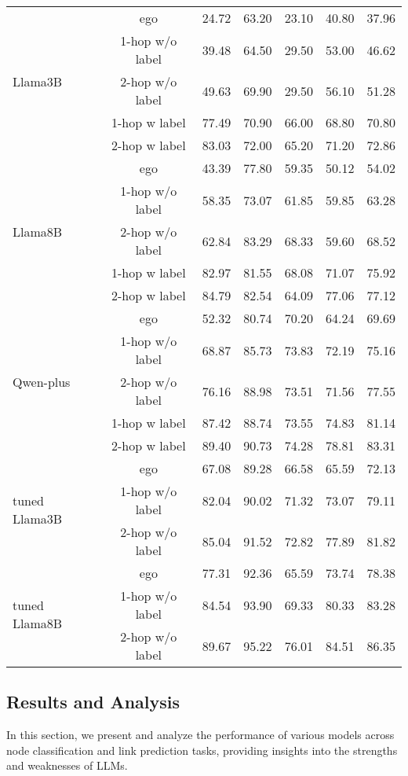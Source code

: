 \begin{table}[htbp]
{\begin{tabular}{l c c c c c c}
\multirow{5}{*}{Llama3B} & ego & 24.72 & 63.20 & 23.10 & 40.80  & 37.96\\
& 1-hop w/o label & 39.48 & 64.50 & 29.50 & 53.00  & 46.62\\
& 2-hop w/o label & 49.63 & 69.90 & 29.50 & 56.10  & 51.28\\
& 1-hop w label & 77.49 & 70.90 & 66.00 & 68.80  & 70.80\\
& 2-hop w label & 83.03 & 72.00 & 65.20 & 71.20  & 72.86\\
\midrule
\multirow{5}{*}{Llama8B} & ego & 43.39 & 77.80 & 59.35 & 50.12  & 54.02\\
& 1-hop w/o label & 58.35 & 73.07 & 61.85 & 59.85  & 63.28\\
& 2-hop w/o label & 62.84 & 83.29 & 68.33 & 59.60  & 68.52\\
& 1-hop w label & 82.97 & 81.55 & 68.08 & 71.07  & 75.92\\
& 2-hop w label & 84.79 & 82.54 & 64.09 & 77.06  & 77.12\\
\midrule
\multirow{5}{*}{Qwen-plus} & ego & 52.32 & 80.74 & 70.20 & 64.24  & 69.69\\
& 1-hop w/o label & 68.87 & 85.73 & 73.83 & 72.19  & 75.16\\
& 2-hop w/o label & 76.16 & 88.98 & 73.51 & 71.56  & 77.55\\
& 1-hop w label & 87.42 & 88.74 & 73.55 & 74.83  & 81.14\\
& 2-hop w label & 89.40 \cellcolor{cyan!50} & 90.73 & 74.28 & 78.81  & 83.31\\
\midrule
\multirow{3}{*}{tuned Llama3B} & ego & 67.08 & 89.28 & 66.58 & 65.59 & 72.13\\
& 1-hop w/o label & 82.04 & 90.02 & 71.32 & 73.07 & 79.11\\
& 2-hop w/o label & 85.04 & 91.52 & 72.82 & 77.89 & 81.82\\
\midrule
\multirow{3}{*}{tuned Llama8B} & ego & 77.31 & 92.36 & 65.59 & 73.74 & 78.38\\
& 1-hop w/o label & 84.54 & 93.90 \cellcolor{cyan!20} & 69.33 & 80.33 & 83.28 \\
& 2-hop w/o label & 89.67 \cellcolor{cyan!100} & 95.22 \cellcolor{cyan!100} & 76.01 \cellcolor{cyan!50} & 84.51 \cellcolor{cyan!100} & 86.35 \cellcolor{cyan!100}\\
\bottomrule
\end{tabular}
}
\end{table}

\subsection{Results and Analysis}\label{sec:benchmarking_results}
In this section, we present and analyze the performance of various models across node classification and link prediction tasks, providing insights into the strengths and weaknesses of LLMs.

